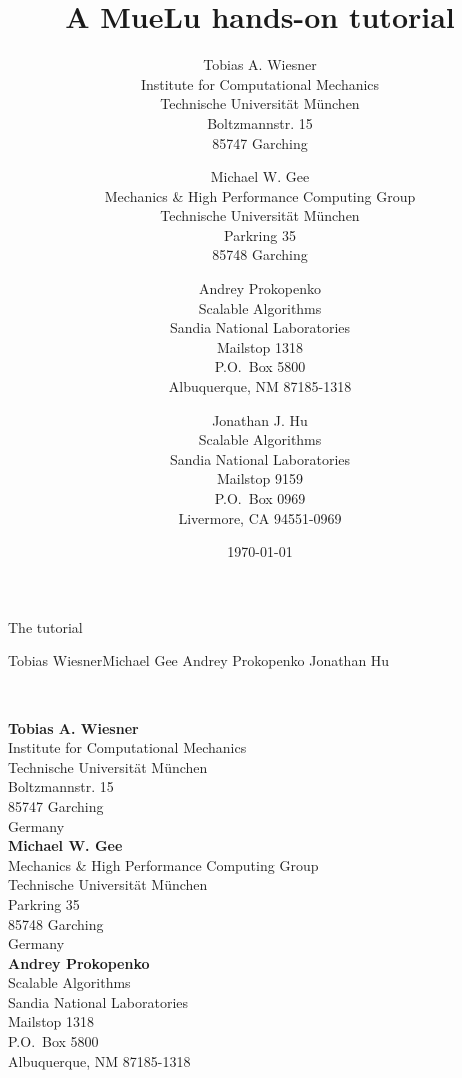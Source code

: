 \documentclass[10pt,fleqn]{book}
\title{A MueLu hands-on tutorial}
\author{Tobias A. Wiesner  \\
	Institute for Computational Mechanics \\
	Technische Universit\"at M\"unchen  \\
	Boltzmannstr. 15 \\
	85747 Garching
	\and
Michael W. Gee\\
Mechanics \& High Performance Computing Group \\
	Technische Universit\"at M\"unchen  \\
	Parkring 35 \\
	85748 Garching
	\and
Andrey Prokopenko \\
Scalable Algorithms \\
Sandia National Laboratories\\
Mailstop 1318 \\
P.O.~Box 5800 \\
Albuquerque, NM 87185-1318\\
\and
Jonathan J. Hu \\
Scalable Algorithms \\
Sandia National Laboratories\\
Mailstop 9159 \\
P.O.~Box 0969 \\
Livermore, CA 94551-0969
	}
\date{\today}
\begin{document}



\begingroup
\thispagestyle{empty}
\centering
\vspace*{9cm}
\par\normalfont\fontsize{35}{35}\sffamily\selectfont
The \muelu tutorial \par %
\vspace*{1cm}
{\Huge \parbox{10cm}{Tobias Wiesner\newline Michael Gee \newline Andrey Prokopenko \newline Jonathan Hu}}\par %
\endgroup


\newpage
~\vfill
\thispagestyle{empty}

\noindent \textbf{Tobias A. Wiesner}  \\
Institute for Computational Mechanics \\
Technische Universit\"at M\"unchen  \\
Boltzmannstr. 15 \\
85747 Garching\\
Germany\\

\noindent \textbf{Michael W. Gee}\\
Mechanics \& High Performance Computing Group \\
Technische Universit\"at M\"unchen  \\
Parkring 35 \\
85748 Garching\\
Germany\\

\noindent \textbf{Andrey Prokopenko} \\
Scalable Algorithms \\
Sandia National Laboratories\\
Mailstop 1318 \\
P.O.~Box 5800 \\
Albuquerque, NM 87185-1318\\
\end{document}
